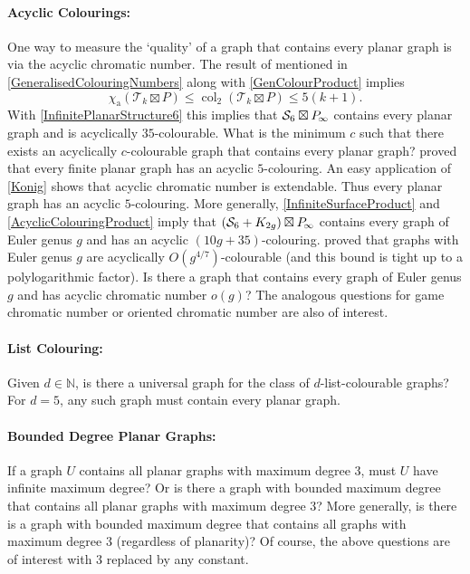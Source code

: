 \documentclass[a4paper,11pt]{article}
\theoremstyle{plain}
\theoremstyle{definition}
\renewcommand{\leq}{\leqslant}
\DeclareMathOperator{\col}{col}
\newcommand{\PP}{P_{\hspace{-0.25ex}\infty}}
\newcommand{\TT}{\mathcal{T}}
\newcommand{\NN}{\mathbb{N}}
\renewcommand{\SS}{\mathcal{S}}
\begin{document}
\paragraph{Acyclic Colourings:} 
One way to measure the `quality' of a  graph that contains every planar graph is via the acyclic chromatic number. The result of \citet{KY03} mentioned in \cref{GeneralisedColouringNumbers} along with \cref{GenColourProduct} implies 
 \begin{equation}
 \label{AcyclicColouringProduct}
 \chi_\text{a}( \TT_k \boxtimes P ) 
 \leq 
 \col_2( \TT_k \boxtimes P ) 
 \leq 
 5(k+1).
 \end{equation}
With \cref{InfinitePlanarStructure6} this implies that $\SS_6 \boxtimes \PP$ contains every planar graph and is acyclically $35$-colourable.  What is the minimum $c$ such that there exists an acyclically $c$-colourable graph that contains every planar graph? \citet{Borodin-DM79} proved that every finite planar graph has an acyclic $5$-colouring. An easy application of \cref{Konig} shows that acyclic chromatic number is extendable. Thus every planar graph has an acyclic $5$-colouring. More generally, \cref{InfiniteSurfaceProduct} and \eqref{AcyclicColouringProduct} imply that $(\SS_6+K_{2g})\boxtimes \PP$ contains every graph of Euler genus $g$ and has an acyclic $(10g+35)$-colouring. \citet{AMS96} proved that graphs with Euler genus $g$ are acyclically $O(g^{4/7})$-colourable (and this bound is tight up to a polylogarithmic factor). Is there a graph that contains every graph of Euler genus $g$ and has acyclic chromatic number $o(g)$? The analogous questions for game chromatic number or oriented chromatic number are also of interest.

\paragraph{List Colouring:} Given $d\in\NN$, is there a universal graph for the class of $d$-list-colourable graphs? For $d=5$, any such graph must contain every planar graph.

\paragraph{Bounded Degree Planar Graphs:} If a graph $U$ contains all planar graphs with maximum degree 3, must $U$ have infinite maximum degree? Or is there a graph with bounded maximum degree that contains all planar graphs with maximum degree 3? More generally, is there is a graph with bounded maximum degree that contains all graphs with maximum degree 3 (regardless of planarity)? Of course, the above questions are of interest with 3 replaced by any constant. 
\end{document}
